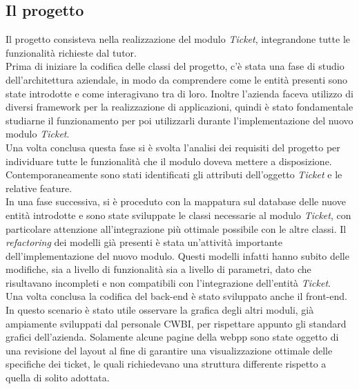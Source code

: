 \subsection{Il progetto}
Il progetto consisteva nella realizzazione del modulo \textit{Ticket}, integrandone tutte le funzionalità richieste dal tutor. \\
Prima di iniziare la codifica delle classi del progetto, c'è stata una fase di studio dell'architettura aziendale, in modo da comprendere come le entità presenti sono state introdotte e come interagivano tra di loro. Inoltre l'azienda faceva utilizzo di diversi framework per la realizzazione di applicazioni, quindi è stato fondamentale studiarne il funzionamento per poi utilizzarli durante l'implementazione del nuovo modulo \textit{Ticket}.\\
Una volta conclusa questa fase si è svolta l'analisi dei requisiti del progetto per individuare tutte le funzionalità che il modulo doveva mettere a disposizione. Contemporaneamente sono stati identificati gli attributi dell'oggetto \textit{Ticket} e le relative feature. \\
In una fase successiva, si è proceduto con la mappatura sul database delle nuove entità introdotte e sono state sviluppate le classi necessarie al modulo \textit{Ticket}, con particolare attenzione all'integrazione più ottimale possibile con le altre classi. Il \textit{refactoring} dei modelli già presenti è stata un'attività importante dell'implementazione del nuovo modulo. Questi modelli infatti hanno subito delle modifiche, sia a livello di funzionalità sia a livello di parametri, dato che risultavano incompleti e non compatibili con l'integrazione  dell'entità \textit{Ticket}.\\
Una volta conclusa la codifica del back-end è stato sviluppato anche il front-end. In questo scenario è stato utile osservare la grafica degli altri moduli, già ampiamente sviluppati dal personale CWBI, per rispettare appunto gli standard grafici dell'azienda. Solamente alcune pagine della webpp sono state oggetto di una revisione del layout al fine di garantire una visualizzazione ottimale delle specifiche dei ticket, le quali richiedevano una struttura differente rispetto a quella di solito adottata.


